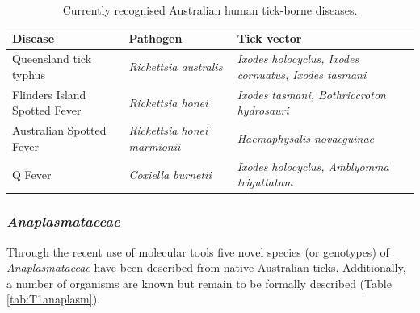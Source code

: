 \documentclass[a4paper, nobind]{templates/ociamthesis}
\begin{document}
\begin{table}

\caption[Australian human tick-borne diseases.]{\label{tab:T1ausTBD}Currently recognised Australian human tick-borne diseases.}
\centering
\fontsize{8.5}{10.5}\selectfont
\begin{tabular}[t]{l>{}l>{}l}
\toprule
Disease & Pathogen & Tick vector\\
\midrule
Queensland tick typhus & \em{Rickettsia australis} & \em{Ixodes holocyclus, Ixodes cornuatus, Ixodes tasmani}\\
Flinders Island Spotted Fever & \em{Rickettsia honei} & \em{Ixodes tasmani, Bothriocroton hydrosauri}\\
Australian Spotted Fever & \em{Rickettsia honei marmionii} & \em{Haemaphysalis novaeguinae}\\
Q Fever & \em{Coxiella burnetii} & \em{Ixodes holocyclus, Amblyomma triguttatum}\\
\bottomrule
\end{tabular}
\end{table}

\hypertarget{anaplasmataceae-1}{%
\subsubsection{\texorpdfstring{\emph{Anaplasmataceae}}{Anaplasmataceae}}\label{anaplasmataceae-1}}

Through the recent use of molecular tools five novel species (or genotypes) of \emph{Anaplasmataceae} have been described from native Australian ticks.
Additionally, a number of organisms are known but remain to be formally described (Table \ref{tab:T1anaplasm}).
\end{document}
